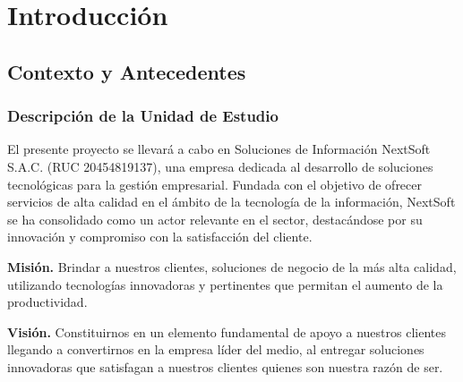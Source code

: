 \documentclass[stu, 12pt, letterpaper, donotrepeattitle, floatsintext, natbib]{apa7}
\begin{document}
\section{Introducción}
\subsection{Contexto y Antecedentes}
\subsubsection{Descripción de la Unidad de Estudio}
El presente proyecto se llevará a cabo en Soluciones de Información NextSoft S.A.C. (RUC 20454819137), una empresa dedicada al desarrollo de
soluciones tecnológicas para la gestión empresarial. Fundada con el objetivo de ofrecer servicios de alta calidad en el ámbito de la tecnología
de la información, NextSoft se ha consolidado como un actor relevante en el sector, destacándose por su innovación y compromiso con la
satisfacción del cliente.

\textbf{Misión. }Brindar a nuestros clientes, soluciones de negocio de la más alta calidad, utilizando tecnologías innovadoras y pertinentes
que permitan el aumento de la productividad.

\textbf{Visión. }Constituirnos en un elemento fundamental de apoyo a nuestros clientes llegando a convertirnos en la empresa líder del medio,
al entregar soluciones innovadoras que satisfagan a nuestros clientes quienes son nuestra razón de ser.
\end{document}
